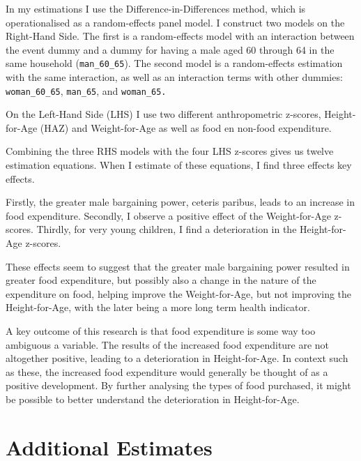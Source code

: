 \documentclass[a4paper,british]{article}\usepackage[]{graphicx}\usepackage[]{color}
\newcommand{\code}[1]{\texttt{#1}}
\begin{document}
In my estimations I use the Difference-in-Differences method, which
is operationalised as a random-effects panel model. I construct two
models on the Right-Hand Side. The first is a random-effects model
with an interaction between the event dummy and a dummy for having
a male aged 60 through 64 in the same household (\code{man\_60\_65}).
The second model is a random-effects estimation with the same interaction,
as well as an interaction terms with other dummies: \code{woman\_60\_65},
\code{man\_65}, and \code{woman\_65.}

On the Left-Hand Side (LHS) I use two different anthropometric z-scores,
Height-for-Age (HAZ) and Weight-for-Age as well as food en non-food
expenditure. 

Combining the three RHS models with the four LHS z-scores gives us
twelve estimation equations. When I estimate of these equations, I
find three effects key effects.

Firstly, the greater male bargaining power, ceteris paribus, leads
to an increase in food expenditure. Secondly, I observe a positive
effect of the Weight-for-Age z-scores. Thirdly, for very young children,
I find a deterioration in the Height-for-Age z-scores.

These effects seem to suggest that the greater male bargaining power
resulted in greater food expenditure, but possibly also a change in
the nature of the expenditure on food, helping improve the Weight-for-Age,
but not improving the Height-for-Age, with the later being a more
long term health indicator.

A key outcome of this research is that food expenditure is some way
too ambiguous a variable. The results of the increased food expenditure
are not altogether positive, leading to a deterioration in Height-for-Age.
In context such as these, the increased food expenditure would generally
be thought of as a positive development. By further analysing the
types of food purchased, it might be possible to better understand
the deterioration in Height-for-Age.

\printbibliography


\appendix

\section{Additional Estimates}
\end{document}

